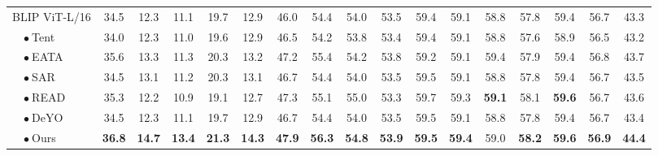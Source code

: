 \documentclass[11pt]{article}
\theoremstyle{plain}
\theoremstyle{definition}
\theoremstyle{remark}
\begin{document}
\begin{table}[h!]
\begin{center}
\begin{threeparttable}
{\begin{tabular}{l|ccccc|ccccc|ccccc|>{\columncolor{blue!8}}c}
    \cmidrule{1-17}
        BLIP ViT-L/16 & 34.5 & 12.3 & 11.1 & 19.7 & 12.9 & 46.0 & 54.4 & 54.0 & 53.5 & 59.4 & 59.1 & 58.8 & 57.8 & 59.4 & 56.7 & 43.3 \\ 
        ~~$\bullet~$Tent & 34.0 & 12.3 & 11.0 & 19.6 & 12.9 & 46.5 & 54.2 & 53.8 & 53.4 & 59.4 & 59.1 & 58.8 & 57.6 & 58.9 & 56.5 & 43.2    \\ %
        ~~$\bullet~$EATA & 35.6 & 13.3 & 11.3 & 20.3 & 13.2 & 47.2 & 55.4 & 54.2 & 53.8 & 59.2 & 59.1 & 59.4 & 57.9 & 59.4 & 56.8 & 43.7  \\
        ~~$\bullet~$SAR & 34.5 & 13.1 & 11.2 & 20.3 & 13.1 & 46.7 & 54.4 & 54.0 & 53.5 & 59.5 & 59.1 & 58.8 & 57.8 & 59.4 & 56.7 & 43.5    \\
        ~~$\bullet~$READ & 35.3 & 12.2 & 10.9 & 19.1 & 12.7 & 47.3 & 55.1 & 55.0 & 53.3 & 59.7 & 59.3 & \textbf{59.1} & 58.1 & \textbf{59.6} & 56.7 & 43.6    \\
        ~~$\bullet~$DeYO & 34.5 & 12.3 & 11.1 & 19.7 & 12.9 & 46.7 & 54.4 & 54.0 & 53.5 & 59.5 & 59.1 & 58.8 & 57.8 & 59.4 & 56.7 & 43.4   \\
        \rowcolor{pink!30}~~$\bullet~$Ours & \textbf{36.8} & \textbf{14.7} & \textbf{13.4} & \textbf{21.3} & \textbf{14.3} & \textbf{47.9} & \textbf{56.3} & \textbf{54.8} & \textbf{53.9} & \textbf{59.5} & \textbf{59.4} & 59.0 & \textbf{58.2} & \textbf{59.6} & \textbf{56.9} & \textbf{44.4} \\
    \cmidrule{1-17}
	\end{tabular}
	}
	 \end{threeparttable}
	 \end{center}
\end{table}
\end{document}
